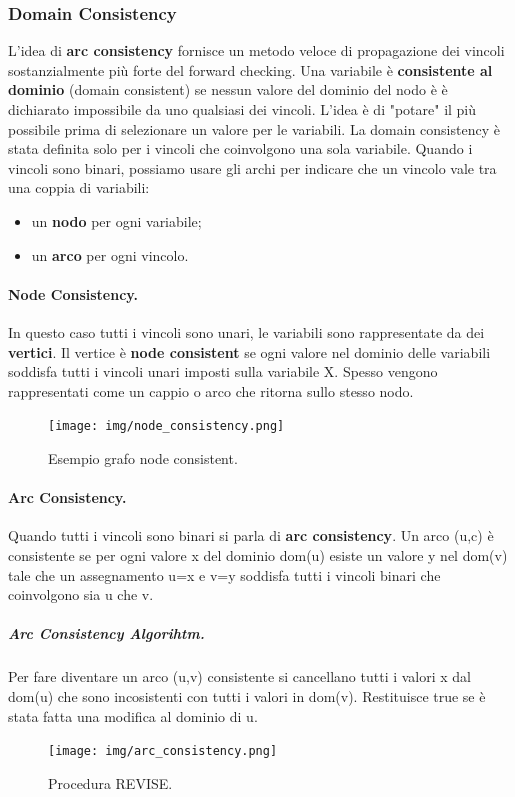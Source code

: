 \subsubsection{Domain Consistency} L'idea di \textbf{arc consistency} fornisce un metodo veloce di propagazione dei vincoli sostanzialmente più forte del forward checking.
Una variabile è \textbf{consistente al dominio} (domain consistent) se nessun valore del dominio del nodo è è dichiarato impossibile da uno qualsiasi dei vincoli. L'idea è di "potare" il più possibile prima di selezionare un valore per le variabili. La domain consistency è stata definita solo per i vincoli che coinvolgono una sola variabile. Quando i vincoli sono binari, possiamo usare gli archi per indicare che un vincolo vale tra una coppia di variabili:
\begin{itemize}
    \item un \textbf{nodo} per ogni variabile;
    \item un \textbf{arco} per ogni vincolo.
\end{itemize}

\paragraph{Node Consistency.} In questo caso tutti i vincoli sono unari, le variabili sono rappresentate da dei \textbf{vertici}. Il vertice è \textbf{node consistent} se ogni valore nel dominio delle variabili soddisfa tutti i vincoli unari imposti sulla variabile X. Spesso vengono rappresentati come un cappio o arco che ritorna sullo stesso nodo. 
\begin{figure}[H]
    \centering
    \texttt{[image: img/node\_consistency.png]}
    \caption{Esempio grafo node consistent.}\label{fig:node_consistency}
\end{figure}

\paragraph{Arc Consistency.} 
Quando tutti i vincoli sono binari si parla di \textbf{arc consistency}. Un arco (u,c) è consistente se per ogni valore x del dominio dom(u) esiste un valore y nel dom(v) tale che un assegnamento u=x e v=y soddisfa tutti i vincoli binari che coinvolgono sia u che v.

\subparagraph{Arc Consistency Algorihtm.} Per fare diventare un arco (u,v) consistente si cancellano tutti i valori x dal dom(u) che sono incosistenti con tutti i valori in dom(v). Restituisce true se è stata fatta una modifica al dominio di u.
\begin{figure}[H]
    \centering
    \texttt{[image: img/arc\_consistency.png]}
    \caption{Procedura REVISE.}\label{fig:arc_consistency}
\end{figure}


